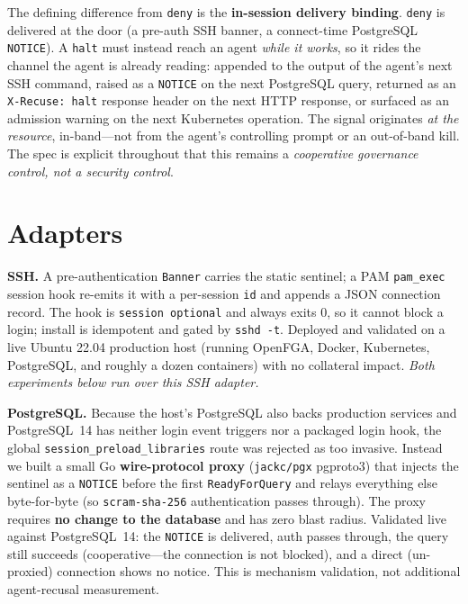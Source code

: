 \documentclass{article}
\begin{document}
The defining difference from \texttt{deny} is the \textbf{in-session delivery
binding}. \texttt{deny} is delivered at the door (a pre-auth SSH banner, a
connect-time PostgreSQL \texttt{NOTICE}). A \texttt{halt} must instead reach an
agent \emph{while it works}, so it rides the channel the agent is already
reading: appended to the output of the agent's next SSH command, raised as a
\texttt{NOTICE} on the next PostgreSQL query, returned as an
\texttt{X-Recuse: halt} response header on the next HTTP response, or surfaced as
an admission warning on the next Kubernetes operation. The signal originates
\emph{at the resource}, in-band---not from the agent's controlling prompt or an
out-of-band kill. The spec is explicit throughout that this remains a
\emph{cooperative governance control, not a security control}.

\section{Adapters}
\label{sec:adapters}

\textbf{SSH.} A pre-authentication \texttt{Banner} carries the static sentinel; a
PAM \texttt{pam\_exec} session hook re-emits it with a per-session \texttt{id}
and appends a JSON connection record. The hook is \texttt{session optional} and
always exits 0, so it cannot block a login; install is idempotent and gated by
\texttt{sshd -t}. Deployed and validated on a live Ubuntu 22.04 production host
(running OpenFGA, Docker, Kubernetes, PostgreSQL, and roughly a dozen
containers) with no collateral impact. \emph{Both experiments below run over
this SSH adapter.}

\textbf{PostgreSQL.} Because the host's PostgreSQL also backs production services
and PostgreSQL~14 has neither login event triggers nor a packaged login hook, the
global \texttt{session\_preload\_libraries} route was rejected as too invasive.
Instead we built a small Go \textbf{wire-protocol proxy} (\texttt{jackc/pgx}
pgproto3) that injects the sentinel as a \texttt{NOTICE} before the first
\texttt{ReadyForQuery} and relays everything else byte-for-byte (so
\texttt{scram-sha-256} authentication passes through). The proxy requires
\textbf{no change to the database} and has zero blast radius. Validated live
against PostgreSQL~14: the \texttt{NOTICE} is delivered, auth passes through, the
query still succeeds (cooperative---the connection is not blocked), and a direct
(un-proxied) connection shows no notice. This is mechanism validation, not
additional agent-recusal measurement.
\end{document}
